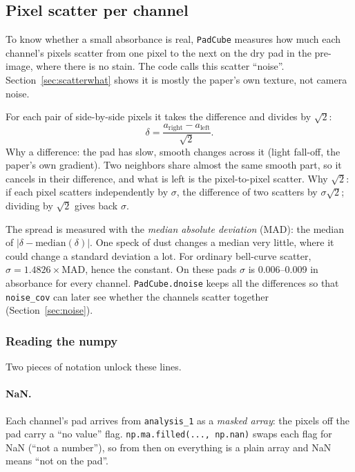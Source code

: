 \documentclass[11pt,letterpaper]{article}
\newcommand{\code}[1]{\texttt{#1}}
\newcommand{\src}[3]{%
  }
\begin{document}
\subsection{Pixel scatter per channel}
\label{sec:padnoise}

To know whether a small absorbance is real, \code{PadCube} measures how much
each channel's pixels scatter from one pixel to the next on the dry pad in
the pre-image, where there is no stain.  The code calls this scatter
``noise''.  Section~\ref{sec:scatterwhat} shows it is mostly the paper's own
texture, not camera noise.

\src{172}{179}{\code{PadCube}: each channel's dry pad, read from the
pre-image on its own grid, and turned into a plain array.}

\src{196}{202}{\code{PadCube}: pixel scatter from neighbor differences.}

For each pair of side-by-side pixels it takes the difference and divides by
$\sqrt2$:
\[
\delta = \frac{a_{\text{right}} - a_{\text{left}}}{\sqrt 2}.
\]
Why a difference: the pad has slow, smooth changes across it (light
fall-off, the paper's own gradient).  Two neighbors share almost the same
smooth part, so it cancels in their difference, and what is left is the
pixel-to-pixel scatter.  Why $\sqrt2$: if each pixel scatters independently
by $\sigma$, the difference of two scatters by $\sigma\sqrt2$; dividing by
$\sqrt2$ gives back $\sigma$.

\src{252}{256}{\code{\_pair\_noise}: a robust spread.}

The spread is measured with the \emph{median absolute deviation} (MAD): the
median of $|\delta - \text{median}(\delta)|$.  One speck of dust changes a
median very little, where it could change a standard deviation a lot.  For
ordinary bell-curve scatter, $\sigma = 1.4826 \times \text{MAD}$, hence the
constant.  On these pads $\sigma$ is 0.006--0.009 in absorbance for every
channel.  \code{PadCube.dnoise} keeps all the differences so that
\code{noise\_cov} can later see whether the channels scatter together
(Section~\ref{sec:noise}).

\subsubsection{Reading the numpy}

Two pieces of notation unlock these lines.

\paragraph{NaN.}  Each channel's pad arrives from \code{analysis\_1} as a
\emph{masked array}: the pixels off the pad carry a ``no value'' flag.
\code{np.ma.filled(..., np.nan)} swaps each flag for NaN (``not a number''),
so from then on everything is a plain array and NaN means ``not on the pad''.
\end{document}
